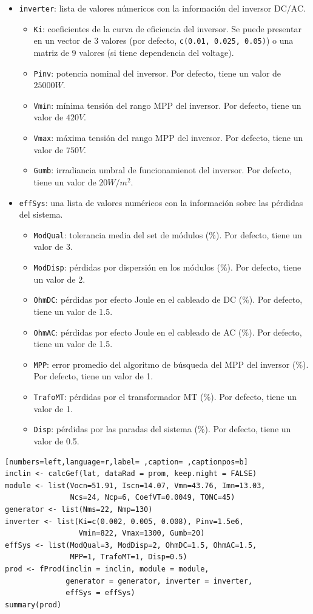 \begin{itemize}
\begin{itemize}
\begin{itemize}
\end{itemize}
\item \texttt{inverter}: lista de valores númericos con la información del inversor DC/AC.
\begin{itemize}
\item \texttt{Ki}: coeficientes de la curva de eficiencia del inversor. Se puede presentar en un vector de 3 valores (por defecto, \texttt{c(0.01, 0.025, 0.05)}) o una matriz de 9 valores (si tiene dependencia del voltage).
\item \texttt{Pinv}: potencia nominal del inversor. Por defecto, tiene un valor de \(25000 W\).
\item \texttt{Vmin}: mínima tensión del rango MPP del inversor. Por defecto, tiene un valor de \(420V\).
\item \texttt{Vmax}: máxima tensión del rango MPP del inversor. Por defecto, tiene un valor de \(750V\).
\item \texttt{Gumb}: irradiancia umbral de funcionamienot del inversor. Por defecto, tiene un valor de \(20W/m^2\).
\end{itemize}
\item \texttt{effSys}: una lista de valores numéricos con la información sobre las pérdidas del sistema.
\begin{itemize}
\item \texttt{ModQual}: tolerancia media del set de módulos (\(\%\)). Por defecto, tiene un valor de 3.
\item \texttt{ModDisp}: pérdidas por dispersión en los módulos (\(\%\)). Por defecto, tiene un valor de 2.
\item \texttt{OhmDC}: pérdidas por efecto Joule en el cableado de DC (\(\%\)). Por defecto, tiene un valor de 1.5.
\item \texttt{OhmAC}: pérdidas por efecto Joule en el cableado de AC (\(\%\)). Por defecto, tiene un valor de 1.5.
\item \texttt{MPP}: error promedio del algoritmo de búsqueda del MPP del inversor (\(\%\)). Por defecto, tiene un valor de 1.
\item \texttt{TrafoMT}: pérdidas por el transformador MT (\(\%\)). Por defecto, tiene un valor de 1.
\item \texttt{Disp}: pérdidas por las paradas del sistema (\(\%\)). Por defecto, tiene un valor de 0.5.
\end{itemize}
\end{itemize}
\end{itemize}
\begin{lstlisting}[numbers=left,language=r,label= ,caption= ,captionpos=b]
inclin <- calcGef(lat, dataRad = prom, keep.night = FALSE)
module <- list(Vocn=51.91, Iscn=14.07, Vmn=43.76, Imn=13.03,
               Ncs=24, Ncp=6, CoefVT=0.0049, TONC=45)
generator <- list(Nms=22, Nmp=130)
inverter <- list(Ki=c(0.002, 0.005, 0.008), Pinv=1.5e6,
                 Vmin=822, Vmax=1300, Gumb=20)
effSys <- list(ModQual=3, ModDisp=2, OhmDC=1.5, OhmAC=1.5,
               MPP=1, TrafoMT=1, Disp=0.5)
prod <- fProd(inclin = inclin, module = module,
              generator = generator, inverter = inverter,
              effSys = effSys)
summary(prod)
\end{lstlisting}

